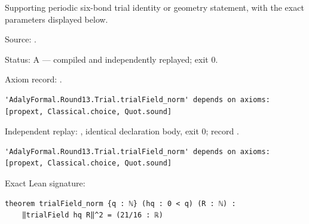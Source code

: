 \begin{theorem}[bp-360]
\label{bp-360}
\leanok
Supporting periodic six-bond trial identity or geometry statement, with the exact parameters displayed below.

\par Source: \texttt{}.
\par Status: A — compiled and independently replayed; exit 0.
\par Axiom record: \texttt{}.
\begin{verbatim}
'AdalyFormal.Round13.Trial.trialField_norm' depends on axioms: [propext, Classical.choice, Quot.sound]
\end{verbatim}
\par Independent replay: \texttt{}, identical declaration body, exit 0; record \texttt{}.
\begin{verbatim}
'AdalyFormal.Round13.Trial.trialField_norm' depends on axioms: [propext, Classical.choice, Quot.sound]
\end{verbatim}
\par Exact Lean signature:
\begin{verbatim}
theorem trialField_norm {q : ℕ} (hq : 0 < q) (R : ℕ) :
    ‖trialField hq R‖^2 = (21/16 : ℝ)
\end{verbatim}
\end{theorem}

